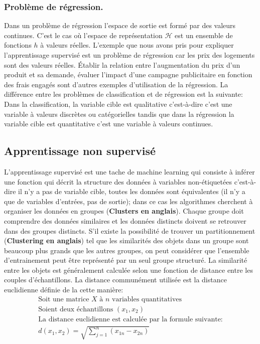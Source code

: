 \documentclass[12pt, french]{report}
\begin{document}
\subsubsection{Problème de régression.} 
Dans un problème de régression l'espace de sortie est formé par des valeurs continues. C'est le cas où l'espace de représentation $\mathcal{H}$ est un ensemble de fonctions $h$ à valeurs réelles. L'exemple que nous avons pris pour expliquer l'apprentissage supervisé est un problème de régression car les prix des logements sont des valeurs réelles. Établir la relation entre l'augmentation du prix d'un produit et sa demande, évaluer l'impact d'une campagne publicitaire en fonction des frais engagés sont d'autres exemples d'utilisation de la régression. La différence entre les problèmes de classification et de régression est la suivante: Dans la classification, la variable cible est qualitative c'est-à-dire c'est une variable à valeurs discrètes ou catégorielles tandis que dans la régression la variable cible est quantitative c'est une variable à valeurs continues. 

\subsection{Apprentissage non supervisé}
 
 L'apprentissage supervisé est une tache de machine learning qui consiste à inférer une fonction qui décrit la structure des données à variables non-étiquetées c'est-à-dire il n'y a pas de variable cible, toutes les données sont équivalentes (il n'y a que de variables d'entrées, pas de sortie); dans ce cas les algorithmes cherchent à organiser les données en groupes (\textbf{Clusters en anglais}). Chaque groupe doit comprendre des données similaires et les données distincts doivent se retrouver dans des groupes distincts. S'il existe la possibilité de trouver un partitionnement (\textbf{Clustering en anglais}) tel que les similarités des objets dans un groupe sont beaucoup plus grands que les autres groupes, on peut considérer que l'ensemble d'entrainement peut être représenté par un seul groupe structuré.  La similarité entre les objets est généralement calculée selon une fonction de distance entre les couples d'échantillons. La distance communément utilisée est la distance euclidienne définie de la cette manière:
 \begin{align*}
 \text{Soit une matrice } X  \text{ à } n \text{ variables quantitatives } \\
 \text{Soient deux échantillons } (x_1, x_2) \\
 \text{La distance euclidienne est calculée par la formule suivante:}\\
 d(x_1,x_2) = \sqrt{\sum_{j=1}^{n} (x_{1n}-x_{2n})}
 \end{align*} 
 
\end{document}
